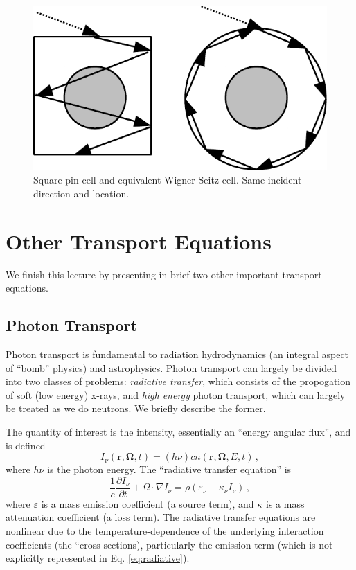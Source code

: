 \begin{figure}[h] 
    \centering
    \includegraphics[keepaspectratio, width = 3.0 in]{wignerseitz}
    \caption{Square pin cell and equivalent Wigner-Seitz cell.  Same incident direction and location.}
    \label{fig:wignerseitz}
\end{figure}

\section*{Other Transport Equations}

We finish this lecture by presenting in brief two other important transport equations.

\subsection*{Photon Transport}

Photon transport is fundamental to radiation hydrodynamics (an integral aspect of ``bomb'' physics) and astrophysics.  Photon transport can largely be divided into two classes of problems: \textit{radiative transfer}, which consists of the propogation of soft (low energy) x-rays, and \textit{high energy} photon transport, which can largely be treated as we do neutrons.  We briefly describe the former.

The quantity of interest is the intensity, essentially an ``energy angular flux'', and is defined
\begin{equation}
 I_{\nu}(\mathbf{r},\mathbf{\Omega},t) = (h\nu)cn(\mathbf{r},\mathbf{\Omega},E,t) \, ,
\end{equation}
where $h\nu$ is the photon energy.  The ``radiative transfer equation'' is
\begin{equation}
 \frac{1}{c}\frac{\partial I_{\nu}}{\partial t} + \Omega \cdot \nabla I_{\nu} = \rho(\varepsilon_{\nu} - \kappa_{\nu}I_{\nu}) \, ,
 \label{eq:radiative}
\end{equation}
where $\varepsilon$ is a mass emission coefficient (a source term), and $\kappa$ is a mass attenuation coefficient (a loss term).  The radiative transfer equations are nonlinear due to the temperature-dependence of the underlying interaction coefficients (the ``cross-sections), particularly the emission term (which is not explicitly represented in Eq. \ref{eq:radiative}).

